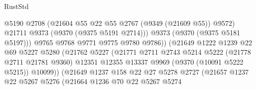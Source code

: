 \begin{lexlean}{RustStd}
\begin{coremodule}
{\begin{coremodule}
{{{{{{{{{{{{{{{{{{{{{{{{{{{{{{{{{{{{{{{                                            @5190
                                            @2708
                                            (@21604 @55 @22 @55 @2767 (@9349 (@21609 @55)) @9572)
                                            @21711
                                            @9373
                                            (@9370 (@9375 @5191 @2714)))
                                          @9373
                                          (@9370 (@9375 @5181 @5197)))
                                        @9765
                                        @9768
                                        @9771
                                        @9775
                                        @9780
                                        @9786))
                                    (@21649
                                      @1222
                                      @1239
                                      @22
                                      @69
                                      @5227
                                      @5280
                                      (@21762
                                        @5227
                                        (@21771
                                          @2711
                                          @2743
                                          @5214
                                          @5222
                                          (@21778 @2711 @21781 @9360)
                                          @12351
                                          @12355
                                          @13337
                                          @9969
                                          (@9370 (@10091 @5222 @5215))
                                          @10099))
                                      (@21649
                                        @1237
                                        @158
                                        @22
                                        @27
                                        @5278
                                        @2727
                                        (@21657
                                          @1237
                                          @22
                                          @5267
                                          @5276
                                          (@21664
                                            @1236
                                            @70
                                            @22
                                            @5267
                                            @5274
}}}}}}}}}}}}}}}}}}}}}}}}}}}}}}}}}}}}}}}
\end{coremodule}}
\end{coremodule}
\end{lexlean}
